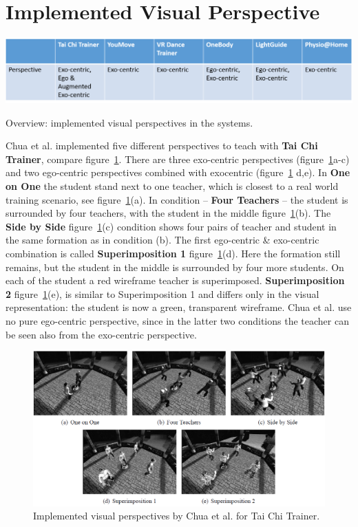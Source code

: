 \section{Implemented Visual Perspective}
\begin{table}[h]
	\centering
	\includegraphics[width=1.0\textwidth]{img/tbl1.png}
	\caption{Overview: implemented visual perspectives in the systems.}
	\label{fig:tbl1}
\end{table}
Chua et al. \cite{Chua2003} implemented five different perspectives to teach with \textbf{Tai Chi Trainer}, compare figure~\ref{fig:taichiperspectives}. There are three exo-centric perspectives (figure~\ref{fig:taichiperspectives}a-c) and two ego-centric perspectives combined with exocentric (figure~\ref{fig:taichiperspectives} d,e). In \textbf{One on One} the student stand next to one teacher, which is closest to a real world training scenario, see figure~\ref{fig:taichiperspectives}(a). In condition \--- \textbf{Four Teachers} \--- the student is surrounded by four teachers, with the student in the middle figure~\ref{fig:taichiperspectives}(b). The \textbf{Side by Side} figure~\ref{fig:taichiperspectives}(c) condition shows four pairs of teacher and student in the same formation as in condition (b). The first ego-centric \& exo-centric combination is called \textbf{Superimposition 1} figure~\ref{fig:taichiperspectives}(d). Here the formation still remains, but the student in the middle is surrounded by four more students. On each of the student a red wireframe teacher is superimposed. \textbf{Superimposition 2} figure~\ref{fig:taichiperspectives}(e), is similar to Superimposition 1 and differs only in the visual representation: the student is now a green, transparent wireframe. Chua et al. use no pure ego-centric perspective, since in the latter two conditions the teacher can be seen also from the exo-centric perspective.
\begin{figure}
	\centering
	\includegraphics[width=1.0\textwidth]{img/taichi_perspectives.png}
	\caption{Implemented visual perspectives by Chua et al. \cite{Chua2003} for Tai Chi Trainer.}
	\label{fig:taichiperspectives}
\end{figure}\\
